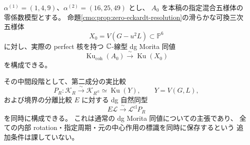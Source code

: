 \begin{theorem}
\label{cmo:thm:fixed-zero-commutative-kernel}
$\alpha^{(1)}=(1,4,9)$、$\alpha^{(2)}=(16,25,49)$ とし、
$A_0$ を本稿の指定混合五様体の零係数模型とする。
命題\ref{cmo:prop:zero-eckardt-resolution}の滑らかな可換三次五様体
\[
 X_0=V(G-u^2L)\subset\mathbb P^6
\]
に対し、実際の perfect 核を持つ $\mathbb C$-線型 dg Morita 同値
\begin{equation}\label{cmo:eq:fixed-zero-commutative-kernel}
 \operatorname{Ku}_{\mathrm{coh}}(A_0)
      \xrightarrow{\ \sim\ }\operatorname{Ku}(X_0)
\end{equation}
を構成できる。

その中間段階として、第二成分の実比較
\[
 P_R:\mathcal K_R\xrightarrow{\sim}\mathcal K_{R^{\mathrm{cl}}}
       \simeq\operatorname{Ku}(Y),\qquad Y=V(G,L),
\]
および境界の分離比較 $E$ に対する dg 自然同型
\begin{equation}\label{cmo:eq:fixed-zero-restriction-square}
 E\mathcal L\xrightarrow{\ \sim\ }\mathcal L^{\mathrm{cl}}P_R
\end{equation}
を同時に構成できる。
これは通常の dg Morita 同値についての主張であり、
全ての内部 rotation・指定周期・元の中心作用の標識を同時に保存するという
追加条件は課していない。
\end{theorem}

